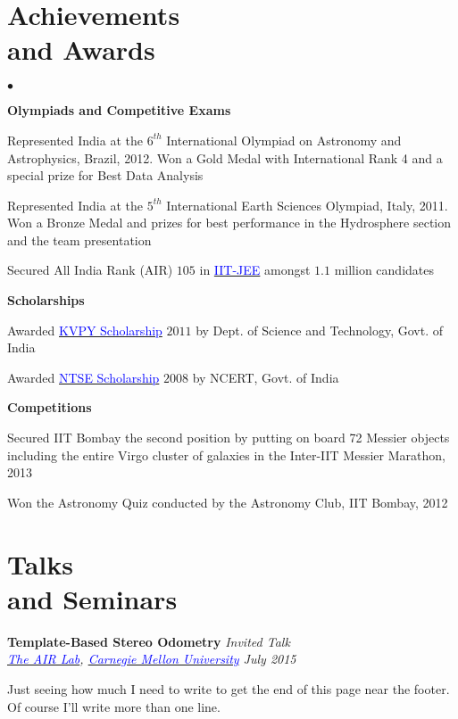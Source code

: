 \documentclass[margin,line]{res}
\newenvironment{list1}{
  \begin{list}{\ding{113}}{%
      \setlength{\itemsep}{0in}
      \setlength{\parsep}{0in} \setlength{\parskip}{0in}
      \setlength{\topsep}{0in} \setlength{\partopsep}{0in} 
      \setlength{\leftmargin}{0.17in}}}{\end{list}}
\newenvironment{list2}{
  \begin{list}{$\bullet$}{%
      \setlength{\itemsep}{0in}
      \setlength{\parsep}{0in} \setlength{\parskip}{0in}
      \setlength{\topsep}{0in} \setlength{\partopsep}{0in} 
      \setlength{\leftmargin}{0.2in}}}{\end{list}}
\begin{document}
\begin{resume}
\section{\sc Achievements \\and Awards}
\begin{list2}
\item[\strut\hspace{0.5cm}\textbf{Olympiads and Competitive Exams}]
\item Represented India at the $6^{th}$ International Olympiad on Astronomy and Astrophysics, Brazil, 2012. Won a Gold Medal with International Rank 4 and a special prize for Best Data Analysis
\item Represented India at the $5^{th}$ International Earth Sciences Olympiad, Italy, 2011. Won a Bronze Medal and prizes for best performance in the Hydrosphere section and the team presentation
\item  Secured All India Rank (AIR) $105$ in \href{https://en.wikipedia.org/wiki/Indian_Institute_of_Technology_Joint_Entrance_Examination}{\textcolor{blue}{IIT-JEE}} amongst $1.1$ million candidates
\vspace{0.05in}
\item[\strut\hspace{0.5cm}\textbf{Scholarships}]
\item Awarded \href{http://www.kvpy.iisc.ernet.in/main/index.htm}{\textcolor{blue}{KVPY Scholarship}} $2011$ by Dept. of Science and Technology, Govt. of India
\item Awarded \href{http://www.ncert.nic.in/programmes/talent_exam/index_talent.html}{\textcolor{blue}{NTSE Scholarship}} $2008$ by NCERT, Govt. of India
\item[\strut\hspace{0.5cm}\textbf{Competitions}]
\item Secured IIT Bombay the second position by putting on board 72 Messier objects including the entire Virgo cluster of galaxies in the Inter-IIT Messier Marathon, 2013
\item Won the Astronomy Quiz conducted by the Astronomy Club, IIT Bombay, 2012
\end{list2}

\section{\sc Talks \\and Seminars}

{\bf Template-Based Stereo Odometry} \hfill {\em Invited Talk} \\
{\em \href{http://theairlab.org/}{\textcolor{blue}{The AIR Lab}}, \href{http://www.cmu.edu/}{\textcolor{blue}{Carnegie Mellon University}} \hfill July 2015} \\
\vspace*{-.15in}
\begin{list1}
\item[] Just seeing how much I need to write to get the end of this page near the footer. \\
Of course I'll write more than one line.
\end{list1}


\end{resume}
\end{document}
